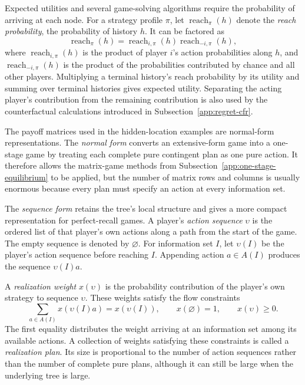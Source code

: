 Expected utilities and several game-solving algorithms require the probability of arriving at each node. For a strategy profile $\pi$, let $\operatorname{reach}_\pi(h)$ denote the \emph{reach probability}, the probability of history $h$. It can be factored as
\[
    \operatorname{reach}_\pi(h)
    =
    \operatorname{reach}_{i,\pi}(h)
    \operatorname{reach}_{-i,\pi}(h),
\]
where $\operatorname{reach}_{i,\pi}(h)$ is the product of player $i$'s action probabilities along $h$, and $\operatorname{reach}_{-i,\pi}(h)$ is the product of the probabilities contributed by chance and all other players. Multiplying a terminal history's reach probability by its utility and summing over terminal histories gives expected utility. Separating the acting player's contribution from the remaining contribution is also used by the counterfactual calculations introduced in Subsection~\ref{app:regret-cfr}.

The payoff matrices used in the hidden-location examples are normal-form representations. The \emph{normal form} converts an extensive-form game into a one-stage game by treating each complete pure contingent plan as one pure action. It therefore allows the matrix-game methods from Subsection~\ref{app:one-stage-equilibrium} to be applied, but the number of matrix rows and columns is usually enormous because every plan must specify an action at every information set.

The \emph{sequence form} retains the tree's local structure and gives a more compact representation for perfect-recall games. A player's \emph{action sequence} $\upsilon$ is the ordered list of that player's own actions along a path from the start of the game. The empty sequence is denoted by $\varnothing$. For information set $I$, let $\upsilon(I)$ be the player's action sequence before reaching $I$. Appending action $a\in A(I)$ produces the sequence $\upsilon(I)a$.

A \emph{realization weight} $x(\upsilon)$ is the probability contribution of the player's own strategy to sequence $\upsilon$. These weights satisfy the flow constraints
\[
    \sum_{a\in A(I)}x(\upsilon(I)a)=x(\upsilon(I)),
    \qquad
    x(\varnothing)=1,
    \qquad
    x(\upsilon)\geq0.
\]
The first equality distributes the weight arriving at an information set among its available actions. A collection of weights satisfying these constraints is called a \emph{realization plan}. Its size is proportional to the number of action sequences rather than the number of complete pure plans, although it can still be large when the underlying tree is large.

